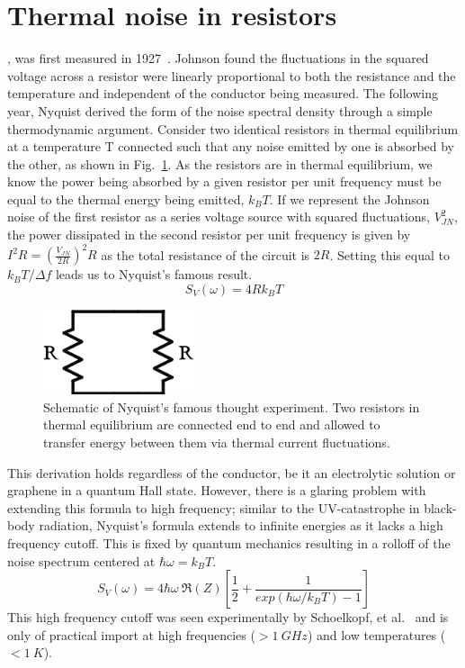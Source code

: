 \section{Thermal noise in resistors}
, was first measured in 1927~\cite{johnson_thermal_1927}. Johnson found the fluctuations in the squared voltage across a resistor were linearly proportional to both the resistance and the temperature and independent of the conductor being measured. The following year, Nyquist derived the form of the noise spectral density through a simple thermodynamic argument. Consider two identical resistors in thermal equilibrium at a temperature T connected such that any noise emitted by one is absorbed by the other, as shown in Fig.~\ref{fig:Nyquist_resistors}. As the resistors are in thermal equilibrium, we know the power being absorbed by a given resistor per unit frequency must be equal to the thermal energy being emitted, $k_BT$. If we represent the Johnson noise of the first resistor as a series voltage source with squared fluctuations, $V_{JN}^2$, the power dissipated in the second resistor per unit frequency is given by $I^2R = \left(\frac{V_{JN}}{2R}\right)^2R$ as the total resistance of the circuit is $2R$. Setting this equal to $k_BT / \Delta f$ leads us to Nyquist's famous result.
\begin{equation}\label{eq:Nyquist}
S_{V}(\omega) = 4Rk_BT
\end{equation}
\begin{figure}
\centering
\includegraphics[height = 25mm]{figures/Johnson_noise_thermometry/Nyquist_resistors.png}
\caption{Schematic of Nyquist's famous thought experiment. Two resistors in thermal equilibrium are connected end to end and allowed to transfer energy between them via thermal current fluctuations.}
\label{fig:Nyquist_resistors}
\end{figure}
This derivation holds regardless of the conductor, be it an electrolytic solution or graphene in a quantum Hall state. However, there is a glaring problem with extending this formula to high frequency; similar to the UV-catastrophe in black-body radiation, Nyquist's formula extends to infinite energies as it lacks a high frequency cutoff. This is fixed by quantum mechanics resulting in a rolloff of the noise spectrum centered at $\hbar\omega = k_BT$.
\begin{equation}\label{eq:NyquistFull}
S_V(\omega) = 4\hbar\omega~\Re(Z)\left[\frac{1}{2}+\frac{1}{exp(\hbar\omega/k_BT)-1}\right]
\end{equation}
This high frequency cutoff was seen experimentally by Schoelkopf, et al.~\cite{schoelkopf_frequency_1997} and is only of practical import at high frequencies ($>1~GHz$) and low temperatures ($<1~K$).


